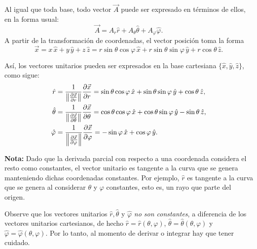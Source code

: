 Al igual que toda base, todo vector $\Vec{A}$ puede ser expresado en términos de ellos, en la forma usual:
\begin{equation}
\Vec{A} = A_r \hat{r} + A_{\theta} \hat{\theta} + A_{\varphi} \hat{\varphi}.
\end{equation}
A partir de la transformación de coordenadas, el vector posición toma la forma
\begin{equation}
\Vec{x} = x \,\hat{x} + y \,\hat{y} + z \,\hat{z} = r \sin \theta \cos \varphi \,\hat{x} + r \sin \theta \sin \varphi \,\hat{y} + r \cos\theta \,\hat{z}.
\end{equation}

Así, los vectores unitarios pueden ser expresados en la base cartesiana $\{\hat{x}, \hat{y}, \hat{z}\}$, como sigue:
\begin{align}
    \hat{r} &= \frac{1}{\left\lVert\frac{\partial \Vec{x}}{\partial r}\right\rVert}\frac{\partial \Vec{x}}{\partial r} = \sin \theta \cos \varphi \,\hat{x} + \sin \theta \sin \varphi \,\hat{y} + \cos \theta \,\hat{z}, \label{rxyz} \\
    \hat{\theta} &= \frac{1}{\left\lVert\frac{\partial \Vec{x}}{\partial \theta}\right\rVert}\frac{\partial \Vec{x}}{\partial \theta} = \cos \theta \cos \varphi \,\hat{x} + \cos \theta \sin \varphi \,\hat{y} - \sin \theta   \,\hat{z},  \\
    \hat{\varphi} &= \frac{1}{\left\lVert\frac{\partial \Vec{x}}{\partial \varphi}\right\rVert}\frac{\partial \Vec{x}}{\partial \varphi} = - \sin \varphi \,\hat{x} + \cos \varphi \,\hat{y} . \label{varphixyz}
\end{align}

\textbf{Nota:} Dado que la derivada parcial con respecto a una coordenada considera el resto como constantes, el vector unitario es tangente a la curva que se genera manteniendo dichas coordenadas constantes. Por ejemplo, $\hat{r}$ es tangente a la curva que se genera al considerar $\theta$ y $\varphi$ constantes, esto es, un rayo que parte del origen.

Observe que los vectores unitarios $\hat{r}, \hat{\theta}$ y $\hat{\varphi}$ \textit{no son constantes}, a diferencia de los vectores unitarios cartesianos, de hecho $\hat{r} = \hat{r}(\theta,\varphi)$, $\hat{\theta} = \hat{\theta}(\theta,\varphi)$ y $\hat{\varphi} = \hat{\varphi}(\theta,\varphi)$. Por lo tanto, al momento de derivar o integrar hay que tener cuidado.

